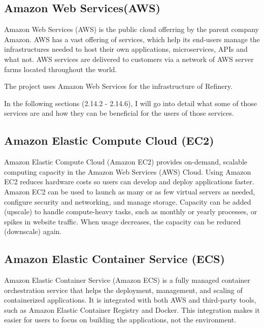 	\subsection{Amazon Web Services(AWS)}
		Amazon Web Services (AWS) \cite{aws} is the public cloud offerring by the parent company Amazon. AWS has a vast offering
		of services, which help its end-users manage the infrastructures needed to host their own applications, 
		microservices, APIs and what not.
		AWS services are delivered to customers via a network of AWS server farms located throughout the world.

		The project uses Amazon Web Services for the infrastructure of Refinery.

		In the following sections (2.14.2 - 2.14.6), I will go into detail what some of those services are and how
		they can be beneficial for the users of those services.

	\subsection{Amazon Elastic Compute Cloud (EC2)}
		Amazon Elastic Compute Cloud (Amazon EC2) \cite{ec2} provides on-demand, scalable computing capacity in the Amazon 
		Web Services (AWS) Cloud. Using Amazon EC2 reduces hardware costs so users can develop and deploy applications faster. 
		Amazon EC2 can be used to launch as many or as few virtual servers as needed, configure security and networking, 
		and manage storage. Capacity can be added (upscale) to handle compute-heavy tasks, such as monthly or yearly processes,
		or spikes in website traffic. When usage decreases, the capacity can be reduced (downscale) again.

	\subsection{Amazon Elastic Container Service (ECS)}
		Amazon Elastic Container Service (Amazon ECS) \cite{ecs} is a fully managed container orchestration service that helps 
		the deployment, management, and scaling of containerized applications. It is integrated with both AWS and third-party tools, 
		such as Amazon Elastic Container Registry and Docker. This integration makes it easier for users to focus on 
		building the applications, not the environment. 

